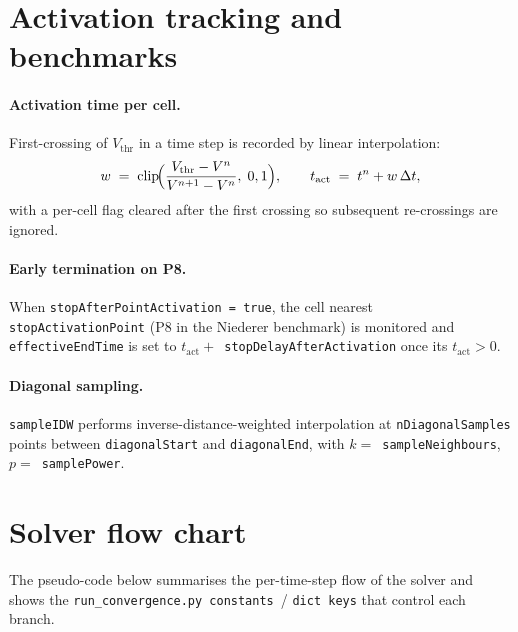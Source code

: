 \documentclass[11pt,a4paper]{article}
\newcommand{\pyconst}[1]{\textcolor{black!60!blue}{\texttt{\footnotesize #1}}}
\newcommand{\dictkey}[1]{\textcolor{black!60!green}{\texttt{\footnotesize #1}}}
\newcommand{\code}[1]{\texttt{\small #1}}
\begin{document}
\section{Activation tracking and benchmarks}

\paragraph{Activation time per cell.}
First-crossing of $V_{\text{thr}}$ in a time step is recorded by linear
interpolation:
\begin{equation}
  w \;=\; \mathrm{clip}\!\Bigl(
      \frac{V_{\text{thr}} - V^{n}}{V^{n+1} - V^{n}},
      \; 0, 1
    \Bigr),
   \qquad
   t_{\text{act}} \;=\; t^{n} + w\, \Delta t,
\end{equation}
with a per-cell flag cleared after the first crossing so subsequent
re-crossings are ignored.

\paragraph{Early termination on P8.}
When \code{stopAfterPointActivation = true}, the cell nearest
\code{stopActivationPoint} (P8 in the Niederer benchmark) is monitored
and \code{effectiveEndTime} is set to $t_{\text{act}} +
$~\code{stopDelayAfterActivation} once its $t_{\text{act}} > 0$.

\paragraph{Diagonal sampling.}
\code{sampleIDW} performs inverse-distance-weighted interpolation at
\code{nDiagonalSamples} points between \code{diagonalStart} and
\code{diagonalEnd}, with $k = $~\code{sampleNeighbours},
$p = $~\code{samplePower}.

\section{Solver flow chart}

The pseudo-code below summarises the per-time-step flow of the solver
and shows the \pyconst{run\_convergence.py constants}~/ \dictkey{dict
keys} that control each branch.
\end{document}
